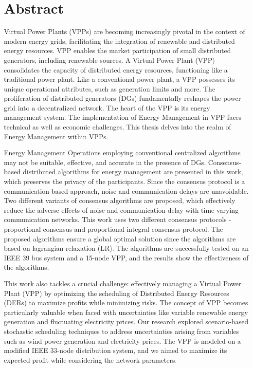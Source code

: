 \documentclass
    [phd,synopsis]
    {iitmdissertation}
\begin{document}
\prematter
\section{Abstract}
Virtual Power Plants (VPPs) are becoming increasingly pivotal in the context of modern energy grids, facilitating the integration of renewable and distributed energy resources. VPP enables the market participation of small distributed generators, including renewable sources. A Virtual Power Plant (VPP) consolidates the capacity of distributed energy resources, functioning like a traditional power plant. Like a conventional power plant, a VPP possesses its unique operational attributes, such as generation limits and more. The proliferation of distributed generators (DGs) fundamentally reshapes the power grid into a decentralized network. The heart of the VPP is its energy management system. The implementation of Energy Management in VPP faces technical as well as economic challenges. This thesis delves into the realm of Energy Management within VPPs. 

Energy Management Operations employing conventional centralized algorithms may not be suitable, effective, and accurate in the presence of DGs. Consensus-based distributed algorithms for energy management are presented in this work, which preserves the privacy of the participants. Since the consensus protocol is a communication-based approach, noise and communication delays are unavoidable. Two different variants of consensus algorithms are proposed, which effectively reduce the adverse effects of noise and communication delay with time-varying communication networks. This work uses two different consensus protocols - proportional consensus and proportional integral consensus protocol. The proposed algorithms ensure a global optimal solution since the algorithms are based on lagrangian relaxation (LR). The algorithms are successfully tested on an IEEE 39 bus system and a 15-node VPP, and the results show the effectiveness of the algorithms. 

This work also tackles a crucial challenge: effectively managing a Virtual Power Plant (VPP) by optimizing the scheduling of Distributed Energy Resources (DERs) to maximize profits while minimizing risks. The concept of VPP becomes particularly valuable when faced with uncertainties like variable renewable energy generation and fluctuating electricity prices. Our research explored scenario-based stochastic scheduling techniques to address uncertainties arising from variables such as wind power generation and electricity prices. The VPP is modeled on a modified IEEE 33-node distribution system, and we aimed to maximize its expected profit while considering the network parameters.
\end{document}
